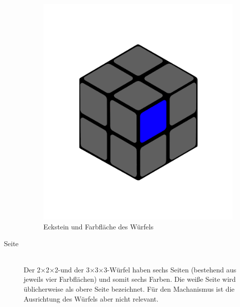 \documentclass[12pt,a4paper, usenames, dvipsnames]{article}
\theoremstyle{mystyle}
\theoremstyle{definition}
\newcommand{\Ttwo}{2$\times$2$\times$2-}
\newcommand{\Tthree}{3$\times$3$\times$3-}
\begin{document}
\begin{description}
\begin{figure}[h]
\includegraphics[scale=0.1]{2x2farbflaeche.png}
\caption[Eckstein und Farbfläche des Würfels]{Eckstein und Farbfläche des Würfels}
\label{Abbildung_Eckstein}
\end{figure} 


\newpage

\item[Seite] \ \\
Der \Ttwo und der \Tthree Würfel haben sechs Seiten (bestehend aus jeweils vier Farbflächen) und somit sechs Farben. Die weiße Seite wird üblicherweise als obere Seite bezeichnet. Für den Machanismus ist die Ausrichtung des Würfels aber nicht relevant.


\end{description}
\end{document}
